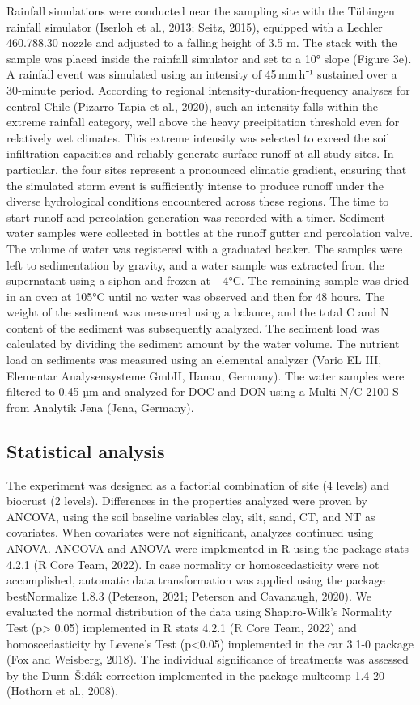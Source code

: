 Rainfall simulations were conducted near the sampling site with the Tübingen rainfall simulator (Iserloh et al., 2013; Seitz, 2015), equipped with a Lechler 460.788.30 nozzle and adjusted to a falling height of 3.5 m. The stack with the sample was placed inside the rainfall simulator and set to a 10° slope (Figure 3e). A rainfall event was simulated using an intensity of 45 mm h⁻¹ sustained over a 30‐minute period. According to regional intensity-duration-frequency analyses for central Chile (Pizarro-Tapia et al., 2020), such an intensity falls within the extreme rainfall category, well above the heavy precipitation threshold even for relatively wet climates. This extreme intensity was selected to exceed the soil infiltration capacities and reliably generate surface runoff at all study sites. In particular, the four sites represent a pronounced climatic gradient, ensuring that the simulated storm event is sufficiently intense to produce runoff under the diverse hydrological conditions encountered across these regions. The time to start runoff and percolation generation was recorded with a timer. Sediment-water samples were collected in bottles at the runoff gutter and percolation valve. The volume of water was registered with a graduated beaker. The samples were left to sedimentation by gravity, and a water sample was extracted from the supernatant using a siphon and frozen at −4°C. The remaining sample was dried in an oven at 105°C until no water was observed and then for 48 hours. The weight of the sediment was measured using a balance, and the total C and N content of the sediment was subsequently analyzed. The sediment load was calculated by dividing the sediment amount by the water volume. The nutrient load on sediments was measured using an elemental analyzer (Vario EL III, Elementar Analysensysteme GmbH, Hanau, Germany). The water samples were filtered to 0.45 µm and analyzed for DOC and DON using a Multi N/C 2100 S from Analytik Jena (Jena, Germany).

\subsection{Statistical analysis}

The experiment was designed as a factorial combination of site (4 levels) and biocrust (2 levels). Differences in the properties analyzed were proven by ANCOVA, using the soil baseline variables clay, silt, sand, CT, and NT as covariates. When covariates were not significant, analyzes continued using ANOVA. ANCOVA and ANOVA were implemented in R using the package stats 4.2.1 (R Core Team, 2022). In case normality or homoscedasticity were not accomplished, automatic data transformation was applied using the package bestNormalize 1.8.3 (Peterson, 2021; Peterson and Cavanaugh, 2020). We evaluated the normal distribution of the data using Shapiro-Wilk's Normality Test (p> 0.05) implemented in R stats 4.2.1 (R Core Team, 2022) and homoscedasticity by Levene's Test (p<0.05) implemented in the car 3.1-0 package (Fox and Weisberg, 2018). The individual significance of treatments was assessed by the Dunn–Šidák correction implemented in the package multcomp 1.4-20 (Hothorn et al., 2008).

